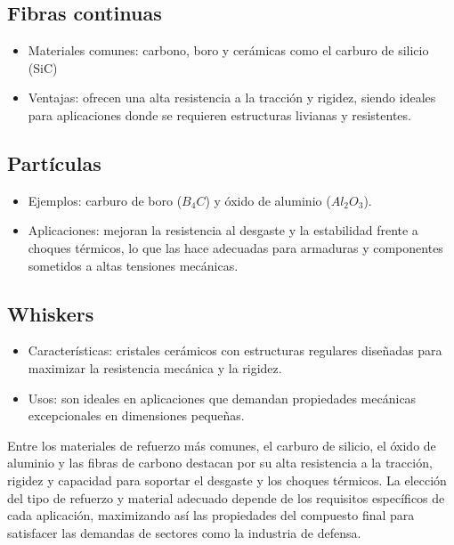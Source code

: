 \documentclass[letterpaper, 12pt]{article}
\begin{document}
\subsection{Fibras continuas}

\begin{itemize}
      \item Materiales comunes: carbono, boro y cerámicas como el carburo de silicio (SiC)
      \item Ventajas: ofrecen una alta resistencia a la tracción y rigidez, siendo ideales
            para aplicaciones donde se requieren estructuras livianas y resistentes.
\end{itemize}

\subsection{Partículas}

\begin{itemize}
      \item Ejemplos: carburo de boro ($B_{4}C$) y óxido de aluminio ($Al_{2}O_{3}$).
      \item Aplicaciones: mejoran la resistencia al desgaste y la estabilidad frente a
            choques térmicos, lo que las hace adecuadas para armaduras y componentes
            sometidos a altas tensiones mecánicas.

\end{itemize}

\subsection{Whiskers}

\begin{itemize}
      \item Características: cristales cerámicos con estructuras regulares diseñadas para
            maximizar la resistencia mecánica y la rigidez.
      \item Usos: son ideales en aplicaciones que demandan propiedades mecánicas
            excepcionales en dimensiones pequeñas.

\end{itemize}

Entre los materiales de refuerzo más comunes, el carburo de silicio, el óxido
de aluminio y las fibras de carbono destacan por su alta resistencia a la
tracción, rigidez y capacidad para soportar el desgaste y los choques térmicos.
La elección del tipo de refuerzo y material adecuado depende de los requisitos
específicos de cada aplicación, maximizando así las propiedades del compuesto
final para satisfacer las demandas de sectores como la industria de defensa.
\end{document}
